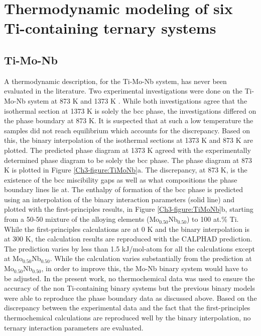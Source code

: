 \section{Thermodynamic modeling of six Ti-containing ternary systems}

\subsection{Ti-Mo-Nb}

A thermodynamic description, for the Ti-Mo-Nb system, has never been evaluated in the literature. Two experimental investigations were done on the Ti-Mo-Nb system at 873 K and 1373 K \cite{English1961,Prokoshkin1967}. While both investigations agree that the isothermal section at 1373 K is solely the bcc phase, the investigations differed on the phase boundary at 873 K. It is suspected that at such a low temperature the samples did not reach equilibrium which accounts for the discrepancy. Based on this, the binary interpolation of the isothermal sections at 1373 K and 873 K are plotted. The predicted phase diagram at 1373 K agreed with the experimentally determined phase diagram to be solely the bcc phase. The phase diagram at 873 K is plotted in Figure \ref{Ch3-figure:TiMoNb}a. The discrepancy, at 873 K, is the existence of the bcc miscibility gaps as well as what compositions the phase boundary lines lie at. The enthalpy of formation of the bcc phase is predicted using an interpolation of the binary interaction parameters (solid line) and plotted with the first-principles results, in Figure \ref{Ch3-figure:TiMoNb}b, starting from a 50-50 mixture of the alloying elements (Mo$_{0.50}$Nb$_{0.50}$) to 100 at.\% Ti. While the first-principles calculations are at 0 K and the binary interpolation is at 300 K, the calculation results are reproduced with the CALPHAD prediction. The prediction varies by less than 1.5 kJ/mol-atom for all the calculations except at Mo$_{0.50}$Nb$_{0.50}$. While the calculation varies substantially from the prediction at Mo$_{0.50}$Nb$_{0.50}$, in order to improve this, the Mo-Nb binary system would have to be adjusted. In the present work, no thermochemical data was used to ensure the accuracy of the non Ti-containing binary systems but the previous binary models were able to reproduce the phase boundary data as discussed above. Based on the discrepancy between the experimental data and the fact that the first-principles thermochemical calculations are reproduced well by the binary interpolation, no ternary interaction parameters are evaluated. 


